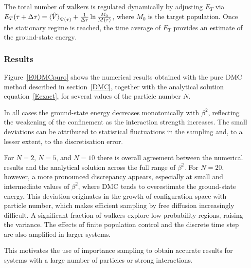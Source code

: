 \documentclass[11pt,a4paper,twoside,pdf]{article}
\numberwithin{equation}{section}
\begin{document}
The total number of walkers is regulated dynamically by adjusting $E_T$ via
$E_T(\tau+\Delta\tau) = \braket{\hat{V}}_{\Psi(\tau)} + \frac{1}{\Delta\tau} \ln\frac{M_0}{M(\tau)}$,
where $M_0$ is the target population. Once the stationary regime is reached, the
time average of $E_T$ provides an estimate of the ground-state energy.


\subsubsection{Results}

Figure~\ref{E0DMCpuro} shows the numerical results obtained with the pure DMC
method described in section~\ref{DMC}, together with the analytical solution
equation~\ref{Eexact}, for several values of the particle number $N$.

In all cases the ground-state energy decreases monotonically with $\beta^2$,
reflecting the weakening of the confinement as the interaction strength increases.
The small deviations can be attributed to statistical fluctuations in the sampling
and, to a lesser extent, to the discretisation error.

For $N=2$, $N=5$, and $N=10$ there is overall agreement between the numerical
results and the analytical solution across the full range of $\beta^2$. For $N=20$,
however, a more pronounced discrepancy appears, especially at small and intermediate
values of $\beta^2$, where DMC tends to overestimate the ground-state energy. This
deviation originates in the growth of configuration space with particle number,
which makes efficient sampling by free diffusion increasingly difficult. A significant
fraction of walkers explore low-probability regions, raising the variance. The effects
of finite population control and the discrete time step are also amplified in larger
systems.

This motivates the use of importance sampling to obtain accurate results for
systems with a large number of particles or strong interactions.
\end{document}

